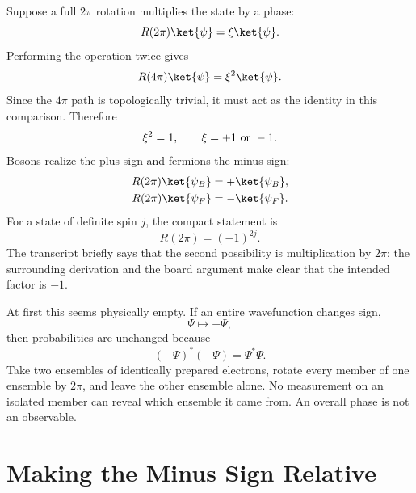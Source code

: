 Suppose a full \(2\pi\) rotation multiplies the state by a phase:
\begin{equation}
R(2\pi)\ket{\psi}=\xi\ket{\psi}.
\end{equation}
Performing the operation twice gives
\begin{equation}
R(4\pi)\ket{\psi}=\xi^2\ket{\psi}.
\end{equation}
Since the \(4\pi\) path is topologically trivial, it must act as the identity in this comparison. Therefore
\begin{equation}
\xi^2=1,
\qquad
\xi=+1\ \hbox{or}\ -1.
\end{equation}
Bosons realize the plus sign and fermions the minus sign:
\begin{align}
R(2\pi)\ket{\psi_B}&=+\ket{\psi_B},\\
R(2\pi)\ket{\psi_F}&=-\ket{\psi_F}.
\end{align}
For a state of definite spin \(j\), the compact statement is
\begin{equation}
R(2\pi)=(-1)^{2j}.
\end{equation}
The transcript briefly says that the second possibility is multiplication by \(2\pi\); the surrounding derivation and the board argument make clear that the intended factor is \(-1\).

At first this seems physically empty. If an entire wavefunction changes sign,
\begin{equation}
\Psi\longmapsto-\Psi,
\end{equation}
then probabilities are unchanged because
\begin{equation}
(-\Psi)^*(-\Psi)=\Psi^*\Psi.
\end{equation}
Take two ensembles of identically prepared electrons, rotate every member of one ensemble by \(2\pi\), and leave the other ensemble alone. No measurement on an isolated member can reveal which ensemble it came from. An overall phase is not an observable.

\section{Making the Minus Sign Relative}

